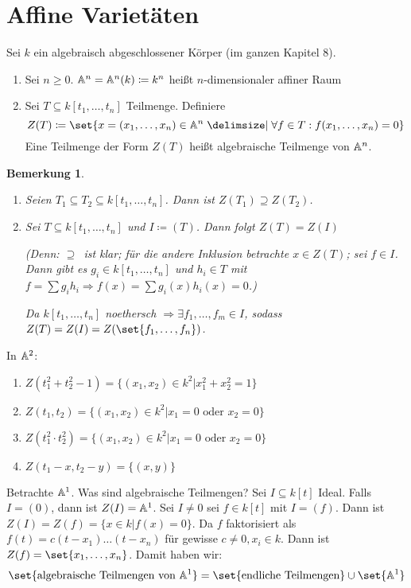 \documentclass[12pt,a4paper]{scrartcl}
\theoremstyle{cplain}
\theoremstyle{cdef}
\newtheorem{beme}[thmcounter]{Bemerkung}
\begin{document}
\section{Affine Varietäten}
Sei $k$ ein algebraisch abgeschlossener Körper (im ganzen Kapitel 8).
\begin{defi}
	\leavevmode
	\begin{enumerate}
		\item Sei $n\geq 0$. $\mathbb A^n= \mathbb A^n (k)\coloneqq k^n$ heißt $n$-dimensionaler affiner Raum
		\item Sei $T\subseteq k[t_1,\dots, t_n]$ Teilmenge. Definiere 
		$$Z(T) \coloneqq \set{x = (x_1,\dots, x_n)\in\IA^n\given \forall f\in T: f(x_1,\dots, x_n) = 0}$$
		Eine Teilmenge der Form $Z(T)$ heißt algebraische Teilmenge von $\mathbb A^n$. 
	\end{enumerate}
\end{defi}
\begin{beme}
	\leavevmode
	\begin{enumerate}
		\item Seien $T_1\subseteq T_2\subseteq k[t_1,\dots, t_n]$. Dann ist $Z(T_1)\supseteq Z(T_2)$.
		\item Sei $T\subseteq k[t_1,\dots, t_n]$ und $I \coloneqq (T)$. Dann folgt $Z(T) = Z(I)$
		
		(Denn: \glqq $\supseteq$\grqq\ ist klar; für die andere Inklusion betrachte $x\in Z(T)$; sei $f\in I$. Dann gibt es $g_i\in k[t_1,\dots, t_n]$ und $h_i\in T$ mit $f = \sum g_ih_i\Rightarrow f(x) = \sum g_i(x)h_i(x) =0$.)
		
		Da $k[t_1,\dots, t_n]$ noethersch $\Rightarrow\exists f_1,\dots, f_m\in I$, sodass $Z(T) = Z(I) = Z(\set{f_1,\dots, f_n})$.
	\end{enumerate}
\end{beme}
\begin{bsp}
	In $\mathbb A^2$:
	\begin{enumerate}
		\item $Z(t_1^2+t_2^2-1) = \{(x_1,x_2)\in k^2|x_1^2+x_2^2 = 1\}$
		\item $Z(t_1, t_2) = \{(x_1,x_2)\in k^2|x_1 = 0\text{ oder }x_2 = 0\}$
		\item $Z(t_1^2\cdot t_2^2) = \{(x_1,x_2)\in k^2|x_1 = 0\text{ oder }x_2 = 0\}$
		\item $Z(t_1-x, t_2-y) = \{(x,y)\}$
	\end{enumerate}
	
\end{bsp}
\begin{bsp} 
	Betrachte $\mathbb A^1$. Was sind algebraische Teilmengen? Sei $I\subseteq k[t]$ Ideal. Falls $I = (0)$, dann ist $Z(I) = \mathbb A^1$. Sei $I\neq 0$ sei $f\in k[t]$ mit $I = (f)$. Dann ist $Z(I) = Z(f) = \{x\in k|f(x) = 0\}$. Da $f$ faktorisiert als $f(t) = c(t-x_1)\dots (t-x_n)$ für gewisse $c \neq 0, x_i\in k$. Dann ist $Z(f) = \set{x_1,\dots, x_n}$. Damit haben wir:
	$$\set{\text{algebraische Teilmengen von }\IA^1} = \set{\text{endliche Teilmengen}}\cup \set{\IA^1}$$
\end{bsp}
\end{document}
